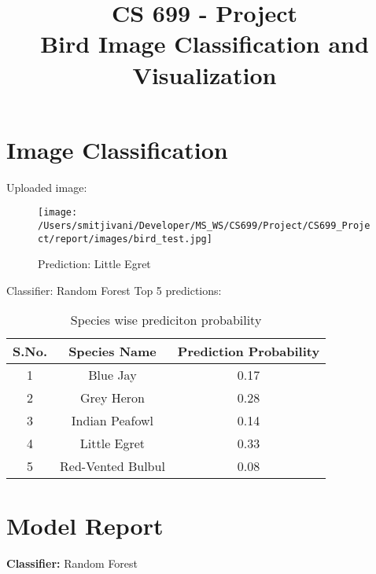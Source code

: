 \documentclass{article}
\date{}
\title{CS 699 - Project\\ Bird Image Classification and Visualization}
\begin{document}
\maketitle

\section{Image Classification}

\noindent Uploaded image:

\begin{figure}[h!]
\centering
\texttt{[image: /Users/smitjivani/Developer/MS\_WS/CS699/Project/CS699\_Project/report/images/bird\_test.jpg]}
\caption*{Prediction: Little Egret}
\label{fig:method}
\end{figure}

\noindent Classifier: Random Forest
\newline
\newline
\newline
\noindent Top 5 predictions:
\newline
\begin{table}[h!]
\centering
\begin{tabular}{|c|c|c|} 
\hline
 S.No. & Species Name & Prediction Probability\\ 
\hline
 1 & Blue Jay & 0.17 \\ 
 \hline
 2 & Grey Heron & 0.28 \\  
 \hline
 3 & Indian Peafowl & 0.14 \\    
 \hline
 4 & Little Egret & 0.33 \\    
 \hline
 5 & Red-Vented Bulbul & 0.08 \\    
 \hline
\end{tabular}
\caption{Species wise prediciton probability}
\label{table:data}
\end{table}




\newpage
\section{Model Report}

\textbf{Classifier:} Random Forest
\newline
\end{document}
